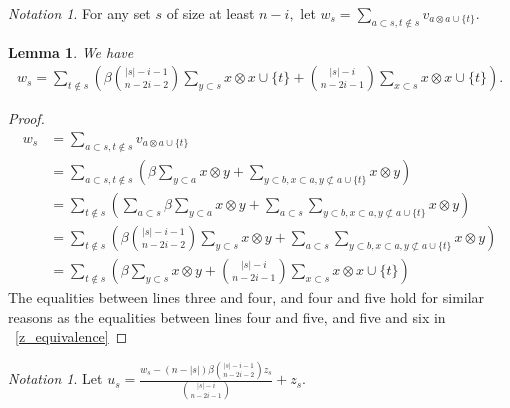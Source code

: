 \documentclass{amsart}
\newtheorem{lem}[thm]{Lemma}
\theoremstyle{remark}
\newtheorem{note}[thm]{Notation}
\begin{document}
\begin{note}
For any set $s$ of size at least $n-i,$ let $w_s = \sum_{a \subset s,t\notin s}^{}v_{a \otimes a \cup \{t\}}.$
\end{note}

\begin{lem}
\label{w_equivalence}
We have 
\begin{align*}
	w_s = \sum_{t\notin s}^{} \left(\beta \binom {|s|-i-1}{n-2i-2}	\sum_{y \subset s}^{}x\otimes x \cup \{t\}  + \binom {|s|-i}{n-2i-1} \sum_{x \subset s}^{}x \otimes x \cup \{t\} \right).
\end{align*}
\end{lem}

\begin{proof}
\begin{align*}
	w_s &= \sum_{a \subset s,t\notin s}^{}v_{a \otimes a \cup \{t\}}\\
	&= \sum_{a \subset s,t\notin s}^{}\left(\beta \sum_{y \subset a}^{}x \otimes y + \sum_{y\subset b,x \subset a,y\not\subset a \cup \{t\}}^{}x\otimes y \right)\\
	&= \sum_{t\notin s}^{}\left(\sum_{a \subset s}^{}\beta \sum_{y \subset a}^{}x \otimes y + \sum_{a \subset s}^{}\sum_{y\subset b,x \subset a,y\not\subset a \cup \{t\}}^{}x\otimes y \right)\\
	&=\sum_{t\notin s}^{}\left(\beta \binom {|s|-i-1}{n-2i-2}\sum_{y \subset s}^{}x\otimes y + \sum_{a \subset s}^{}\sum_{y\subset b,x \subset a,y\not\subset a \cup \{t\}}^{}x\otimes y \right)\\
	&=\sum_{t\notin s}^{} \left(\beta \sum_{y \subset s}^{}x\otimes y + \binom {|s|-i}{n-2i-1}\sum_{x \subset s}^{}x \otimes x \cup \{t\} \right)
\end{align*}
The equalities between lines three and four, and four and five hold for similar reasons as the equalities between lines four and five, and five and six in ~\ref{z_equivalence}
\end{proof}

\begin{note}
Let $u_s = \frac{w_s - (n - |s|)\beta \binom {|s|-i-1}{n-2i-2} z_s}{\binom {|s|-i}{n-2i-1}} + z_s.$
\end{note}
\end{document}
